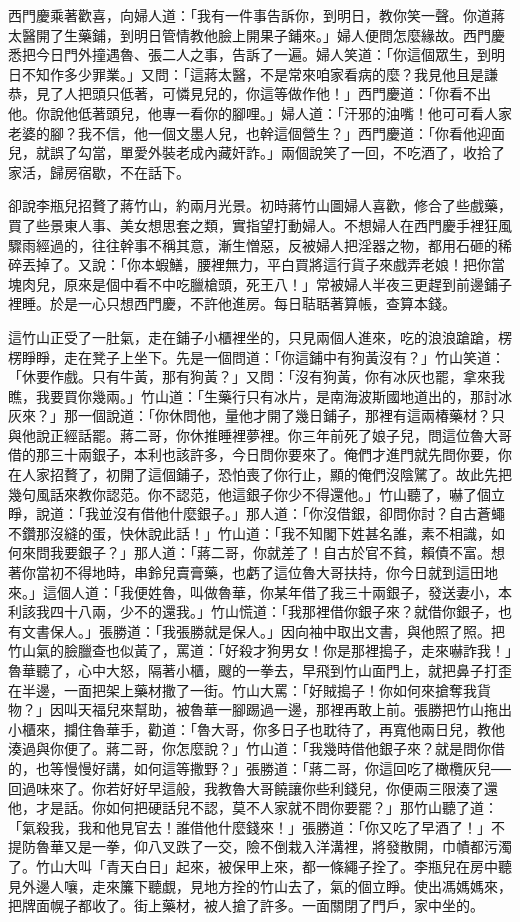 西門慶乘著歡喜，向婦人道：「我有一件事告訴你，到明日，教你笑一聲。你道蔣太醫開了生藥鋪，到明日管情教他臉上開果子鋪來。」婦人便問怎麼緣故。西門慶悉把今日門外撞遇魯、張二人之事，告訴了一遍。婦人笑道：「你這個眾生，到明日不知作多少罪業。」又問：「這蔣太醫，不是常來咱家看病的麼？我見他且是謙恭，見了人把頭只低著，可憐見兒的，你這等做作他！」西門慶道：「你看不出他。你說他低著頭兒，他專一看你的腳哩。」婦人道：「汗邪的油嘴！他可可看人家老婆的腳？我不信，他一個文墨人兒，也幹這個營生？」西門慶道：「你看他迎面兒，就誤了勾當，單愛外裝老成內藏奸詐。」兩個說笑了一回，不吃酒了，收拾了家活，歸房宿歇，不在話下。

卻說李瓶兒招贅了蔣竹山，約兩月光景。初時蔣竹山圖婦人喜歡，修合了些戲藥，買了些景東人事、美女想思套之類，實指望打動婦人。不想婦人在西門慶手裡狂風驟雨經過的，往往幹事不稱其意，漸生憎惡，反被婦人把淫器之物，都用石砸的稀碎丟掉了。又說：「你本蝦鱔，腰裡無力，平白買將這行貨子來戲弄老娘！把你當塊肉兒，原來是個中看不中吃臘槍頭，死王八！」常被婦人半夜三更趕到前邊鋪子裡睡。於是一心只想西門慶，不許他進房。每日聐聒著算帳，查算本錢。

這竹山正受了一肚氣，走在鋪子小櫃裡坐的，只見兩個人進來，吃的浪浪蹌蹌，楞楞睜睜，走在凳子上坐下。先是一個問道：「你這鋪中有狗黃沒有？」竹山笑道： 「休要作戲。只有牛黃，那有狗黃？」又問：「沒有狗黃，你有冰灰也罷，拿來我瞧，我要買你幾兩。」竹山道：「生藥行只有冰片，是南海波斯國地道出的，那討冰灰來？」那一個說道：「你休問他，量他才開了幾日鋪子，那裡有這兩椿藥材？只與他說正經話罷。蔣二哥，你休推睡裡夢裡。你三年前死了娘子兒，問這位魯大哥借的那三十兩銀子，本利也該許多，今日問你要來了。俺們才進門就先問你要，你在人家招贅了，初開了這個鋪子，恐怕喪了你行止，顯的俺們沒陰騭了。故此先把幾句風話來教你認范。你不認范，他這銀子你少不得還他。」竹山聽了，嚇了個立睜，說道：「我並沒有借他什麼銀子。」那人道：「你沒借銀，卻問你討？自古蒼蠅不鑽那沒縫的蛋，快休說此話！」竹山道：「我不知閣下姓甚名誰，素不相識，如何來問我要銀子？」那人道：「蔣二哥，你就差了！自古於官不貧，賴債不富。想著你當初不得地時，串鈴兒賣膏藥，也虧了這位魯大哥扶持，你今日就到這田地來。」這個人道：「我便姓魯，叫做魯華，你某年借了我三十兩銀子，發送妻小，本利該我四十八兩，少不的還我。」竹山慌道：「我那裡借你銀子來？就借你銀子，也有文書保人。」張勝道：「我張勝就是保人。」因向袖中取出文書，與他照了照。把竹山氣的臉臘查也似黃了，罵道：「好殺才狗男女！你是那裡搗子，走來嚇詐我！」魯華聽了，心中大怒，隔著小櫃，颼的一拳去，早飛到竹山面門上，就把鼻子打歪在半邊，一面把架上藥材撒了一街。竹山大罵：「好賊搗子！你如何來搶奪我貨物？」因叫天福兒來幫助，被魯華一腳踢過一邊，那裡再敢上前。張勝把竹山拖出小櫃來，攔住魯華手，勸道：「魯大哥，你多日子也耽待了，再寬他兩日兒，教他湊過與你便了。蔣二哥，你怎麼說？」竹山道：「我幾時借他銀子來？就是問你借的，也等慢慢好講，如何這等撒野？」張勝道：「蔣二哥，你這回吃了橄欖灰兒──回過味來了。你若好好早這般，我教魯大哥饒讓你些利錢兒，你便兩三限湊了還他，才是話。你如何把硬話兒不認，莫不人家就不問你要罷？」那竹山聽了道：「氣殺我，我和他見官去！誰借他什麼錢來！」張勝道：「你又吃了早酒了！」不提防魯華又是一拳，仰八叉跌了一交，險不倒栽入洋溝裡，將發散開，巾幘都污濁了。竹山大叫「青天白日」起來，被保甲上來，都一條繩子拴了。李瓶兒在房中聽見外邊人嚷，走來簾下聽覷，見地方拴的竹山去了，氣的個立睜。使出馮媽媽來，把牌面幌子都收了。街上藥材，被人搶了許多。一面關閉了門戶，家中坐的。

